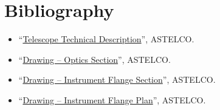 \section{Bibliography}

\begin{flushleft}
\begin{itemize}
\item “\href{bibliography/astelco-telescope-technical-description.pdf}{Telescope Technical Description}”, ASTELCO.
\item “\href{bibliography/astelco-telescope-drawing-optics-section.pdf}{Drawing -- Optics Section}”, ASTELCO.
\item “\href{bibliography/astelco-telescope-drawing-instrument-flange-section.pdf}{Drawing -- Instrument Flange Section}”, ASTELCO.
\item “\href{bibliography/astelco-telescope-drawing-instrument-flange-plan.pdf}{Drawing -- Instrument Flange Plan}”, ASTELCO.
\end{itemize}
\end{flushleft}
